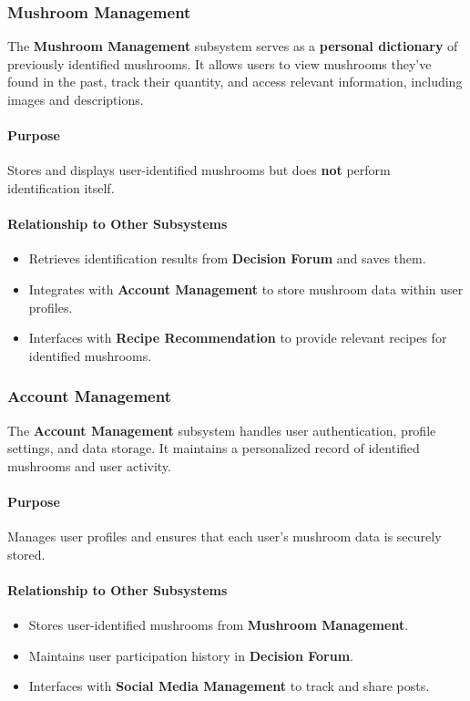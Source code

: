 \documentclass[]{article}
\begin{document}
\subsubsection{Mushroom Management}
The \textbf{Mushroom Management} subsystem serves as a \textbf{personal dictionary} of previously identified mushrooms. It allows users to view mushrooms they’ve found in the past, track their quantity, and access relevant information, including images and descriptions.
 
\paragraph{Purpose}
Stores and displays user-identified mushrooms but does \textbf{not} perform identification itself.
 
\paragraph{Relationship to Other Subsystems}
\begin{itemize}
    \item Retrieves identification results from \textbf{Decision Forum} and saves them.
    \item Integrates with \textbf{Account Management} to store mushroom data within user profiles.
    \item Interfaces with \textbf{Recipe Recommendation} to provide relevant recipes for identified mushrooms.
\end{itemize}
 
\subsubsection{Account Management}
The \textbf{Account Management} subsystem handles user authentication, profile settings, and data storage. It maintains a personalized record of identified mushrooms and user activity.
 
\paragraph{Purpose}
Manages user profiles and ensures that each user’s mushroom data is securely stored.
 
\paragraph{Relationship to Other Subsystems}
\begin{itemize}
    \item Stores user-identified mushrooms from \textbf{Mushroom Management}.
    \item Maintains user participation history in \textbf{Decision Forum}.
    \item Interfaces with \textbf{Social Media Management} to track and share posts.
\end{itemize}
 
\end{document}
